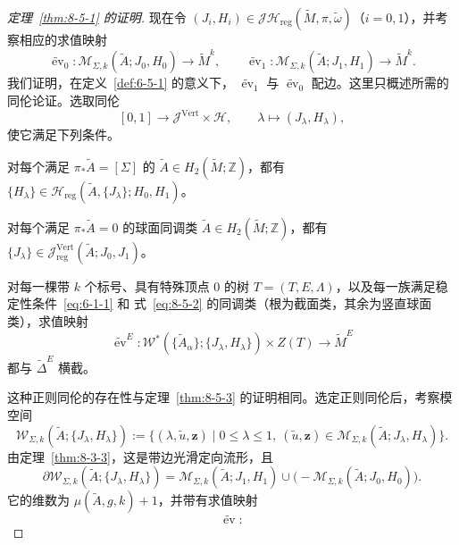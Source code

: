\begin{proof}[定理~\ref{thm:8-5-1} 的证明]
现在令
$(J_i,H_i)\in\mathcal J\mathcal H_{\mathrm{reg}}
(\widetilde M,\pi,\widetilde\omega)$（$i=0,1$），并考察相应的求值映射
\[
  \widetilde{\operatorname{ev}}_0:
  \mathcal M_{\Sigma,k}(\widetilde A;J_0,H_0)\to\widetilde M^k,
  \qquad
  \widetilde{\operatorname{ev}}_1:
  \mathcal M_{\Sigma,k}(\widetilde A;J_1,H_1)\to\widetilde M^k.
\]
我们证明，在定义~\ref{def:6-5-1} 的意义下，
$\widetilde{\operatorname{ev}}_1$ 与
$\widetilde{\operatorname{ev}}_0$ 配边。这里只概述所需的同伦论证。选取同伦
\[
  [0,1]\longrightarrow\mathcal J^{\mathrm{Vert}}\times\mathcal H,
  \qquad \lambda\longmapsto(J_\lambda,H_\lambda),
\]
使它满足下列条件。
\begin{description}[leftmargin=3.8em,style=nextline]
\item[\textup{(H)}] 对每个满足 $\pi_*\widetilde A=[\Sigma]$ 的
$\widetilde A\in H_2(\widetilde M;\mathbb Z)$，都有
$\{H_\lambda\}\in
\mathcal H_{\mathrm{reg}}(\widetilde A,\{J_\lambda\};H_0,H_1)$。
\item[\textup{(V)}] 对每个满足 $\pi_*\widetilde A=0$ 的球面同调类
$\widetilde A\in H_2(\widetilde M;\mathbb Z)$，都有
$\{J_\lambda\}\in
\mathcal J_{\mathrm{reg}}^{\mathrm{Vert}}(\widetilde A;J_0,J_1)$。
\item[\textup{(EW)}] 对每一棵带 $k$ 个标号、具有特殊顶点 $0$ 的树
$T=(T,E,\Lambda)$，以及每一族满足稳定性条件~\eqref{eq:6-1-1} 和
式~\eqref{eq:8-5-2} 的同调类（根为截面类，其余为竖直球面类），求值映射
\[
  \widetilde{\operatorname{ev}}^E:
  \mathcal W^*(\{\widetilde A_\alpha\};\{J_\lambda,H_\lambda\})
  \times Z(T)\longrightarrow\widetilde M^E
\]
都与 $\widetilde\Delta^E$ 横截。
\end{description}
这种正则同伦的存在性与定理~\ref{thm:8-5-3} 的证明相同。选定正则同伦后，考察模空间
\[
  \mathcal W_{\Sigma,k}
  (\widetilde A;\{J_\lambda,H_\lambda\})
  :=\bigl\{(\lambda,\widetilde u,\mathbf z)\mid0\le\lambda\le1,\
  (\widetilde u,\mathbf z)
  \in\mathcal M_{\Sigma,k}(\widetilde A;J_\lambda,H_\lambda)\bigr\}.
\]
由定理~\ref{thm:8-3-3}，这是带边光滑定向流形，且
\[
  \partial\mathcal W_{\Sigma,k}
  (\widetilde A;\{J_\lambda,H_\lambda\})
  =\mathcal M_{\Sigma,k}(\widetilde A;J_1,H_1)
   \cup\bigl(-\mathcal M_{\Sigma,k}(\widetilde A;J_0,H_0)\bigr).
\]
它的维数为 $\mu(\widetilde A,g,k)+1$，并带有求值映射
\begin{equation}\label{eq:8-5-8}
  \widetilde{\operatorname{ev}}:

\end{equation}
\end{proof}
